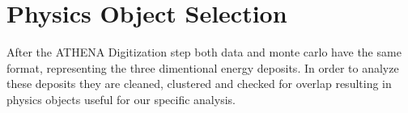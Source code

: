 \chapter{Physics Object Selection} \label{chap:objects}

After the ATHENA Digitization step both data and monte carlo have the same
format, representing the three dimentional energy deposits.  In order to analyze
these deposits they are cleaned, clustered and checked for overlap resulting in
physics objects useful for our specific analysis.








